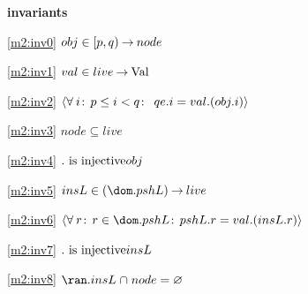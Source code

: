 \textbf{invariants}
\begin{block}
\item[ \eqref{m2:inv0} ]$obj \in [p,q) \mathbin\rightarrow node $ %
\item[ \eqref{m2:inv1} ]$val \in live \mathbin\rightarrow \text{Val} $ %
\item[ \eqref{m2:inv2} ]${ \langle \forall \:i\!:\,  p \le i < q \!:\,  ~ qe.i = val.(obj.i)  \rangle } $ %
\item[ \eqref{m2:inv3} ]$node \subseteq live $ %
\item[ \eqref{m2:inv4} ]$. \text{ is injective}obj $ %
\item[ \eqref{m2:inv5} ]$insL \in (\dom.pshL) \tfun live $ %
\item[ \eqref{m2:inv6} ]$\qforall{r} %
			{ r \in \dom.pshL } %
			{ pshL.r = val.(insL.r) } $ %
\item[ \eqref{m2:inv7} ]$. \text{ is injective}insL $ %
\item[ \eqref{m2:inv8} ]$\ran.insL \binter node = \emptyset $ %
\end{block}
